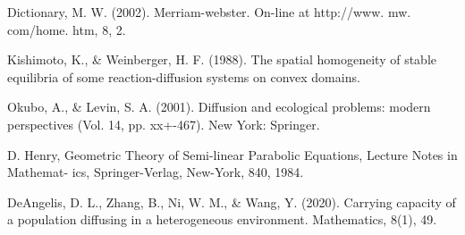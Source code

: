 \documentclass[10pt]{amsart}
\theoremstyle{definition}
\begin{document}
\begin{thebibliography}{}
Dictionary, M. W. (2002). Merriam-webster. On-line at http://www. mw. com/home. htm, 8, 2.

Kishimoto, K., \& Weinberger, H. F. (1988). The spatial homogeneity of stable equilibria of some reaction-diffusion systems on convex domains.

Okubo, A., \& Levin, S. A. (2001). Diffusion and ecological problems: modern perspectives (Vol. 14, pp. xx+-467). New York: Springer.

D. Henry, Geometric Theory of Semi-linear Parabolic Equations, Lecture Notes in Mathemat- ics, Springer-Verlag, New-York, 840, 1984.

DeAngelis, D. L., Zhang, B., Ni, W. M., \& Wang, Y. (2020). Carrying capacity of a population diffusing in a heterogeneous environment. Mathematics, 8(1), 49.






\end{thebibliography}
\end{document}
